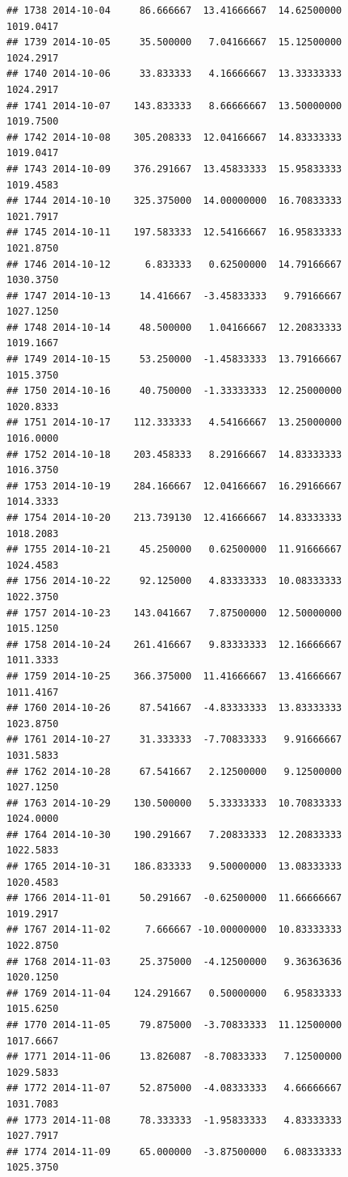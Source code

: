 \documentclass[
]{article}
\begin{document}
\begin{verbatim}
## 1738 2014-10-04     86.666667  13.41666667  14.62500000    1019.0417
## 1739 2014-10-05     35.500000   7.04166667  15.12500000    1024.2917
## 1740 2014-10-06     33.833333   4.16666667  13.33333333    1024.2917
## 1741 2014-10-07    143.833333   8.66666667  13.50000000    1019.7500
## 1742 2014-10-08    305.208333  12.04166667  14.83333333    1019.0417
## 1743 2014-10-09    376.291667  13.45833333  15.95833333    1019.4583
## 1744 2014-10-10    325.375000  14.00000000  16.70833333    1021.7917
## 1745 2014-10-11    197.583333  12.54166667  16.95833333    1021.8750
## 1746 2014-10-12      6.833333   0.62500000  14.79166667    1030.3750
## 1747 2014-10-13     14.416667  -3.45833333   9.79166667    1027.1250
## 1748 2014-10-14     48.500000   1.04166667  12.20833333    1019.1667
## 1749 2014-10-15     53.250000  -1.45833333  13.79166667    1015.3750
## 1750 2014-10-16     40.750000  -1.33333333  12.25000000    1020.8333
## 1751 2014-10-17    112.333333   4.54166667  13.25000000    1016.0000
## 1752 2014-10-18    203.458333   8.29166667  14.83333333    1016.3750
## 1753 2014-10-19    284.166667  12.04166667  16.29166667    1014.3333
## 1754 2014-10-20    213.739130  12.41666667  14.83333333    1018.2083
## 1755 2014-10-21     45.250000   0.62500000  11.91666667    1024.4583
## 1756 2014-10-22     92.125000   4.83333333  10.08333333    1022.3750
## 1757 2014-10-23    143.041667   7.87500000  12.50000000    1015.1250
## 1758 2014-10-24    261.416667   9.83333333  12.16666667    1011.3333
## 1759 2014-10-25    366.375000  11.41666667  13.41666667    1011.4167
## 1760 2014-10-26     87.541667  -4.83333333  13.83333333    1023.8750
## 1761 2014-10-27     31.333333  -7.70833333   9.91666667    1031.5833
## 1762 2014-10-28     67.541667   2.12500000   9.12500000    1027.1250
## 1763 2014-10-29    130.500000   5.33333333  10.70833333    1024.0000
## 1764 2014-10-30    190.291667   7.20833333  12.20833333    1022.5833
## 1765 2014-10-31    186.833333   9.50000000  13.08333333    1020.4583
## 1766 2014-11-01     50.291667  -0.62500000  11.66666667    1019.2917
## 1767 2014-11-02      7.666667 -10.00000000  10.83333333    1022.8750
## 1768 2014-11-03     25.375000  -4.12500000   9.36363636    1020.1250
## 1769 2014-11-04    124.291667   0.50000000   6.95833333    1015.6250
## 1770 2014-11-05     79.875000  -3.70833333  11.12500000    1017.6667
## 1771 2014-11-06     13.826087  -8.70833333   7.12500000    1029.5833
## 1772 2014-11-07     52.875000  -4.08333333   4.66666667    1031.7083
## 1773 2014-11-08     78.333333  -1.95833333   4.83333333    1027.7917
## 1774 2014-11-09     65.000000  -3.87500000   6.08333333    1025.3750

\end{verbatim}
\end{document}
